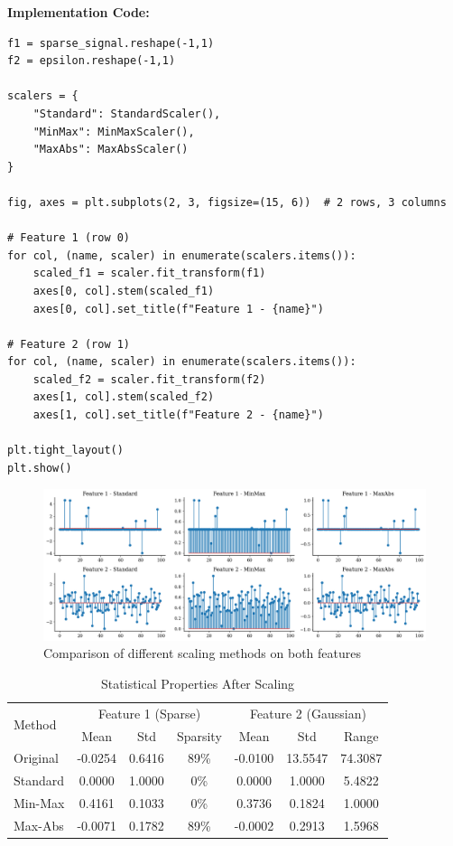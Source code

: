 \documentclass[12pt]{article}
\begin{document}
\textbf{Implementation Code:}
\begin{lstlisting}[caption={Scaling Methods Implementation}]
f1 = sparse_signal.reshape(-1,1)
f2 = epsilon.reshape(-1,1)

scalers = {
    "Standard": StandardScaler(),
    "MinMax": MinMaxScaler(),
    "MaxAbs": MaxAbsScaler()
}

fig, axes = plt.subplots(2, 3, figsize=(15, 6))  # 2 rows, 3 columns

# Feature 1 (row 0)
for col, (name, scaler) in enumerate(scalers.items()):
    scaled_f1 = scaler.fit_transform(f1)
    axes[0, col].stem(scaled_f1)
    axes[0, col].set_title(f"Feature 1 - {name}")

# Feature 2 (row 1)
for col, (name, scaler) in enumerate(scalers.items()):
    scaled_f2 = scaler.fit_transform(f2)
    axes[1, col].stem(scaled_f2)
    axes[1, col].set_title(f"Feature 2 - {name}")

plt.tight_layout()
plt.show()
\end{lstlisting}

\begin{figure}[H]
    \centering
    \includegraphics[width=\textwidth]{resources/scaling_comparison.png}
    \caption{Comparison of different scaling methods on both features}
    \label{fig:scaling_comparison}
\end{figure}


\begin{table}[H]
\centering
\caption{Statistical Properties After Scaling}
\label{tab:scaling_stats}
\begin{tabular}{@{}lcccccc@{}}
\toprule
\multirow{2}{*}{Method} & \multicolumn{3}{c}{Feature 1 (Sparse)} & \multicolumn{3}{c}{Feature 2 (Gaussian)} \\
\cmidrule(lr){2-4} \cmidrule(lr){5-7}
& Mean & Std & Sparsity & Mean & Std & Range \\
\midrule
Original & -0.0254 & 0.6416 & 89\% & -0.0100 & 13.5547 & 74.3087 \\
Standard & 0.0000 & 1.0000 & 0\% & 0.0000 & 1.0000 & 5.4822 \\
Min-Max & 0.4161 & 0.1033 & 0\% & 0.3736 & 0.1824 & 1.0000 \\
Max-Abs & -0.0071 & 0.1782 & 89\% & -0.0002 & 0.2913 & 1.5968 \\
\bottomrule
\end{tabular}
\end{table}
\end{document}
